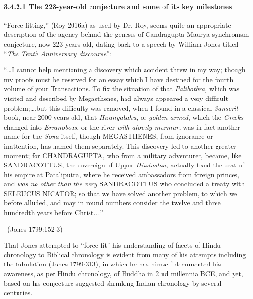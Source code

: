 \newpage

\paragraph*{3.4.2.1 The 223-year-old conjecture and some of its key milestones}

“Force-fitting,” (Roy 2016a) as used by Dr. Roy, seems quite an appropriate description of the agency behind the genesis of Candragupta-Maurya synchronism conjecture, now 223 years old, dating back to a speech by William Jones titled “\textit{The Tenth Anniversary discourse}”:

\begin{myquote}
“…I cannot help mentioning a discovery which accident threw in my way; though my proofs must be reserved for an essay which I have destined for the fourth volume of your Transactions. To fix the situation of that \textit{Pālibothra,} which was visited and described by Megasthenes, had always appeared a very difficult problem;….but this difficulty was removed, when I found in a classical\textit{ Sanscrit} book, near 2000 years old, that \textit{Hiranyabahu}, or \textit{golden-armed}, which the \textit{Greeks} changed into \textit{Erranoboas}, or the river \textit{with a}\textit{lovely murmur,} was in fact another name for the \textit{Sona} itself, though MEGASTHENES, from ignorance or inattention, has named them separately. This discovery led to another greater moment; for CHANDRAGUPTA\textit{,} who from a military adventurer, became, like SANDRACOTTUS, the sovereign of Upper \textit{Hindustan}, actually fixed the seat of his empire at Pataliputra, where he received ambassadors from foreign princes, and \textit{was no other than the very} SANDRACOTTUS who concluded a treaty with SELEUCUS NICATOR; so that we have solved another problem, to which we before alluded, and may in round numbers consider the twelve and three hundredth years before Christ\textit{...}” 

~\hfill (Jones 1799:152-3)
\end{myquote}

That Jones attempted to “force-fit” his understanding of facets of Hindu chronology to Biblical chronology is evident from many of his attempts including the tabulation (Jones 1799:313), in which he has himself documented his awareness, as per Hindu chronology, of Buddha in 2 nd millennia BCE, and yet, based on his conjecture suggested shrinking Indian chronology by several centuries.

